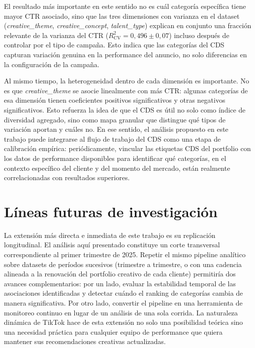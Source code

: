 \documentclass[12pt, a4paper]{report}
\begin{document}
El resultado más importante en este sentido no es cuál categoría específica tiene mayor
CTR asociado, sino que las tres dimensiones con varianza en el dataset (\textit{creative\_theme},
\textit{creative\_concept}, \textit{talent\_type}) explican en conjunto una fracción relevante
de la varianza del CTR ($R^2_{\text{CV}} = 0{,}496 \pm 0{,}07$) incluso después de
controlar por el tipo de campaña. Esto indica que las categorías del CDS capturan
variación genuina en la performance del anuncio, no solo diferencias en la configuración
de la campaña.

Al mismo tiempo, la heterogeneidad dentro de cada dimensión es importante. No es que
\textit{creative\_theme} se asocie linealmente con más CTR: algunas categorías de esa
dimensión tienen coeficientes positivos significativos y otras negativos significativos. Esto
refuerza la idea de que el CDS es útil no solo como índice de diversidad agregado, sino
como mapa granular que distingue qué tipos de variación aportan y cuáles no. En ese
sentido, el análisis propuesto en este trabajo puede integrarse al flujo de trabajo del CDS
como una etapa de calibración empírica: periódicamente, vincular las etiquetas CDS del
portfolio con los datos de performance disponibles para identificar qué categorías, en el
contexto específico del cliente y del momento del mercado, están realmente correlacionadas
con resultados superiores.

\section{Líneas futuras de investigación}

La extensión más directa e inmediata de este trabajo es su replicación longitudinal. El
análisis aquí presentado constituye un corte transversal correspondiente al primer
trimestre de 2025. Repetir el mismo pipeline analítico sobre datasets de períodos
sucesivos (trimestre a trimestre, o con una cadencia alineada a la renovación del
portfolio creativo de cada cliente) permitiría dos avances complementarios: por un lado,
evaluar la estabilidad temporal de las asociaciones identificadas y detectar cuándo el
ranking de categorías cambia de manera significativa. Por otro lado, convertir el pipeline en
una herramienta de monitoreo continuo en lugar de un análisis de una sola corrida. La
naturaleza dinámica de TikTok hace de esta extensión no solo una posibilidad teórica
sino una necesidad práctica para cualquier equipo de performance que quiera mantener
sus recomendaciones creativas actualizadas.
\end{document}
